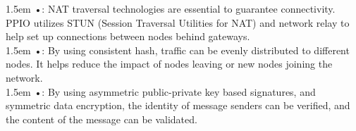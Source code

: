 \documentclass[10pt,a4paper]{article}
\begin{document}
\hangindent 1.5em
\noindent   
•: NAT traversal technologies are essential to guarantee connectivity. PPIO utilizes STUN (Session Traversal Utilities for NAT) and network relay to help set up connections between nodes behind gateways.
\vspace{-0.8em}
\\

\hangindent 1.5em
\noindent   
•: By using consistent hash\cite{article11}, traffic can be evenly distributed to different nodes. It helps reduce the impact of nodes leaving or new nodes joining the network.
\vspace{-0.8em}
\\

\hangindent 1.5em
\noindent   
•: By using asymmetric public-private key based signatures, and symmetric data encryption, the identity of message senders can be verified, and the content of the message can be validated.
\vspace{-0.5em}
\end{document}
